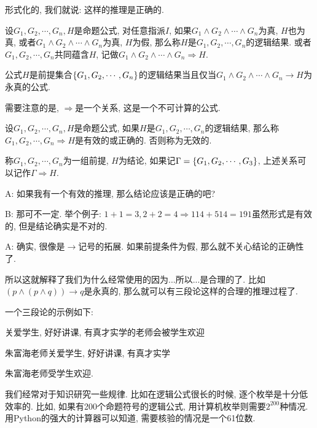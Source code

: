 形式化的, 我们就说: 这样的推理是正确的. 

\begin{definition}
	设$G_1,G_2,\cdots,G_n,H$是命题公式, 对任意指派$I$, 如果$G_1\land G_2\land \cdots\land G_n$为真, $H$也为真, 或者$G_1\land G_2\land \cdots\land G_n$为真, $H$为假, 那么称$H$是$G_1, G_2, \cdots, G_n$的逻辑结果. 或者$G_1, G_2, \cdots, G_n$共同蕴含$H$, 记做$G_1\land G_2\land \cdots\land G_n\Rightarrow H$. 
\end{definition}


\begin{theorem}
	公式$H$是前提集合$\{G_1,G_2,\cdots,G_n\}$的逻辑结果当且仅当$G_1\land G_2\land \cdots\land G_n\to H$为永真的公式. 
\end{theorem}

需要注意的是, $\Rightarrow$是一个关系, 这是一个不可计算的公式. 

\begin{definition}
	设$G_1, G_2, \cdots, G_n,H$是命题公式, 如果$H$是$G_1, G_2, \cdots, G_n$的逻辑结果, 那么称$G_1, G_2, \cdots, G_n\Rightarrow H$是有效的或正确的. 否则称为无效的. 
	
	称$G_1, G_2, \cdots, G_n$为一组前提, $H$为结论, 如果记$\Gamma=\{G_1,G_2,\cdots,G_3\}$, 上述关系可以记作$\Gamma\Rightarrow H$. 
\end{definition}

\begin{dialogue}
	A: 如果我有一个有效的推理, 那么结论应该是正确的吧? 
	
	B: 那可不一定. 举个例子: $1+1=3, 2+2=4 \Rightarrow 114+514=191$虽然形式是有效的, 但是结论确实是不对的.
	
	A: 确实, 很像是$\rightarrow$记号的拓展. 如果前提条件为假, 那么就不关心结论的正确性了. 
\end{dialogue}

所以这就解释了我们为什么经常使用的因为...所以...是合理的了. 比如$(p\land(p\land q))\to q$是永真的, 那么就可以有三段论这样的合理的推理过程了. 

\begin{example}
	一个三段论的示例如下: 
	
	关爱学生, 好好讲课, 有真才实学的老师会被学生欢迎
	
	朱富海老师关爱学生, 好好讲课, 有真才实学
	
	朱富海老师受学生欢迎. 
\end{example}

我们经常对于知识研究一些规律. 比如在逻辑公式很长的时候, 逐个枚举是十分低效率的. 比如, 如果有200个命题符号的逻辑公式, 用计算机枚举则需要$2^{200}$种情况. 用Python的强大的计算器可以知道, 需要核验的情况是一个61位数.

